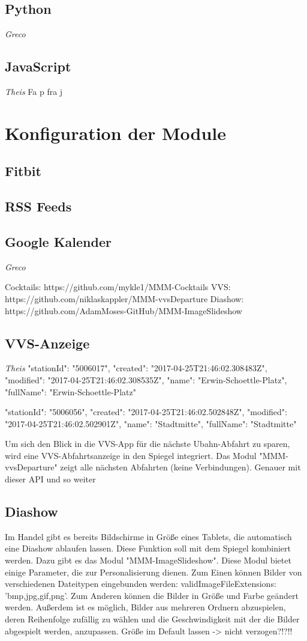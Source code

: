 \documentclass[12pt,a4paper]{report}
\begin{document}
\subsection*{Python}
\textit{Greco}
\subsection*{JavaScript}
\textit{Theis}
Fa p fra j
\section{Konfiguration der Module}
\subsection{Fitbit}
\subsection{RSS Feeds}
\subsection{Google Kalender}
\textit{Greco}





Cocktails: https://github.com/mykle1/MMM-Cocktails
VVS: https://github.com/niklaskappler/MMM-vvsDeparture
Diashow: https://github.com/AdamMoses-GitHub/MMM-ImageSlideshow

\subsection{VVS-Anzeige}
\textit{Theis}
"stationId": "5006017",
"created": "2017-04-25T21:46:02.308483Z",
"modified": "2017-04-25T21:46:02.308535Z",
"name": "Erwin-Schoettle-Platz",
"fullName": "Erwin-Schoettle-Platz"

  "stationId": "5006056",
"created": "2017-04-25T21:46:02.502848Z",
"modified": "2017-04-25T21:46:02.502901Z",
"name": "Stadtmitte",
"fullName": "Stadtmitte"

Um sich den Blick in die VVS-App für die nächste Ubahn-Abfahrt zu sparen, wird eine VVS-Abfahrtsanzeige in den Spiegel integriert. Das Modul "MMM-vvsDeparture" zeigt alle nächsten Abfahrten (keine Verbindungen). 
Genauer mit dieser API und so weiter
\subsection{Diashow}
Im Handel gibt es bereits Bildschirme in Größe eines Tablets, die automatisch eine Diashow ablaufen lassen. Diese Funktion soll mit dem Spiegel kombiniert werden. Dazu gibt es das Modul "MMM-ImageSlideshow". 
Diese Modul bietet einige Parameter, die zur Personalisierung dienen. 
Zum Einen können Bilder von verschiedenen Dateitypen eingebunden werden: validImageFileExtensions: 'bmp,jpg,gif,png'. Zum Anderen können die Bilder in Größe und Farbe geändert werden. Außerdem ist es möglich, Bilder aus mehreren Ordnern abzuspielen, deren Reihenfolge zufällig zu wählen und die Geschwindigkeit mit der die Bilder abgespielt werden, anzupassen. 
Größe im Default lassen -> nicht verzogen?!?!!
\end{document}
